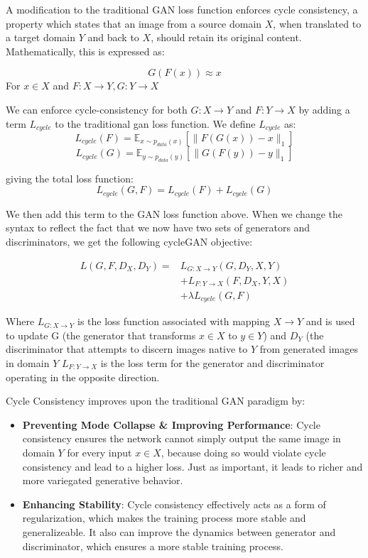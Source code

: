 \documentclass[12pt]{article}
\begin{document}
A modification to the traditional GAN loss function enforces cycle consistency, a property which states that an image from a source domain \(X\), when translated to a target domain \(Y\) and back to \(X\), should retain its original content. Mathematically, this is expressed as:

\begin{equation}
G(F(x)) \approx x
\end{equation}
For \(x \in X\) and \(F: X \rightarrow Y, G: Y\rightarrow X\)

We can enforce cycle-consistency for both \(G: X \rightarrow Y\) and \(F: Y \rightarrow X\) by adding a term \(L_{cycle}\) to the traditional gan loss function. We define \(L_{cycle}\) as:
\[L_{cycle}(F) = \mathbb{E}_{x \sim p_{data}(x)}[\|F(G(x)) - x\|_1]\]
\[L_{cycle}(G) = \mathbb{E}_{y \sim p_{data}(y)}[\|G(F(y)) - y\|_1]\]

giving the total loss function:
\begin{equation}
L_{cycle}(G, F) = L_{cycle}(F) + L_{cycle}(G)
\end{equation}

We then add this term to the GAN loss function above. When we change the syntax to reflect the fact that we now have two sets of generators and discriminators, we get the following cycleGAN objective:

\begin{align}
    L(G, F, D_X, D_Y) = &L_{G: X \rightarrow Y}(G, D_Y, X, Y) \nonumber \\
    &+ L_{F: Y \rightarrow X}(F, D_X, Y, X) \nonumber \\
    &+ \lambda L_{cycle}(G, F)
\end{align}

Where \(L_{G: X \rightarrow Y}\) is the loss function associated with mapping \(X \rightarrow Y \) and is used to update G (the generator that transforms \( x \in X\) to \(y \in Y\)) and \(D_Y\) (the discriminator that attempts to discern images native to \(Y\) from generated images in domain \(Y\) \(L_{F: Y \rightarrow X}\) is the loss term for the generator and discriminator operating in the opposite direction. 

Cycle Consistency improves upon the traditional GAN paradigm by: 
\begin{itemize}
\item\textbf{Preventing Mode Collapse \& Improving Performance}: Cycle consistency ensures the network cannot simply output the same image in domain \(Y\) for every input \(x \in X\), because doing so would violate cycle consistency and lead to a higher loss. Just as important, it leads to richer and more variegated generative behavior.
\item\textbf{Enhancing Stability}: Cycle consistency effectively acts as a form of regularization, which makes the training process more stable and generalizeable. It also can improve the dynamics between generator and discriminator, which ensures a more stable training process.
\end{itemize}
\end{document}
